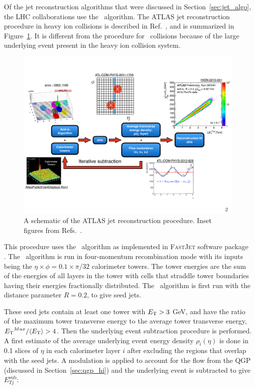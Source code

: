 Of the jet reconstruction algorithms that were discussed in Section~\ref{sec:jet_algo}, the LHC collaborations use the \antikt\ algorithm.
The ATLAS jet reconstruction procedure in heavy ion collisions is described in Ref.~\cite{2019108}, and is summarized in Figure~\ref{fig:atlasHIjetreco}.
It is different from the procedure for \pp\ collisions because of the large underlying event present in the heavy ion collision system.

\begin{figure}[htbp!]
	\centering
	\includegraphics[width=\textwidth]{figures/setup/atlasHIjetReco} %
	\caption{A schematic of the ATLAS jet reconstruction procedure.
	Inset figures from Refs.~\cite{Cacciari:2008gp, atlasRun1EventDisplay, ATLAS-COM-PHYS-2011-1733, Cole:1450219, perfPlots}.}	
	\label{fig:atlasHIjetreco}%
\end{figure}

This procedure uses the \antikt\ algorithm as implemented in \textsc{FastJet} software package \cite{fastjet_algo}.
The \antikt\ algorithm is run in four-momentum recombination mode with its inputs being the $\eta \times \phi = 0.1 \times \pi / 32$ calorimeter towers.
The tower energies are the sum of the energies of all layers in the tower with cells that straddle tower boundaries having their energies fractionally distributed.
The \antikt\ algorithm is first run with the distance parameter $R=0.2$, to give seed jets.

These seed jets contain at least one tower with $\mbox{$E_{\mathrm{T}}$} > 3$ GeV, and have the ratio of the maximum tower transverse energy to the average tower transverse energy, $\mbox{$E_{\mathrm{T}}$}^{Max} / \langle \mbox{$E_{\mathrm{T}}$} \rangle > 4$.
Then the underlying event subtraction procedure is performed.
A first estimate of the average underlying event energy density $\rho_i (\eta)$ is done in 0.1 slices of $\eta$ in each calorimeter layer $i$ after excluding the regions that overlap with the seed jets.
A modulation is applied to account for the flow from the QGP (discussed in Section~\ref{sec:qgp_hi}) and the underlying event is subtracted to give $E_{Tj}^{\mathrm{sub}}$:

